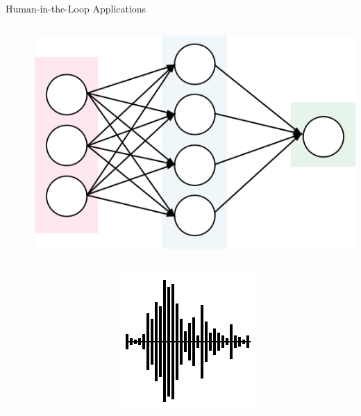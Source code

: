 \documentclass[aspectratio=1610]{beamer}
\begin{document}
\begin{frame}{Human-in-the-Loop Applications}
\begin{columns}[onlytextwidth]
\begin{column}{.25\linewidth}
        \end{column}
        \begin{column}{.5\linewidth}
            \centering
        \end{column}%
        \begin{column}{.25\linewidth}
            \centering%
            \includegraphics[width=\linewidth]{img/NN.png}\\
        \end{column}%
    \end{columns}%
    \begin{columns}[onlytextwidth]
        \begin{column}{.335\linewidth}%
        \end{column}%
        \begin{column}{.1\linewidth}
            \centering%
            \includegraphics[width=\linewidth]{img/sound_wave.png}

\end{column}
\end{columns}
\end{frame}
\end{document}
